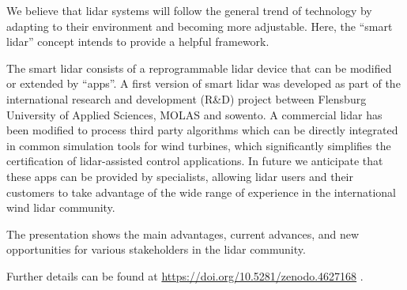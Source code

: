 \begin{altquote}
    We believe that lidar systems will follow the general trend of technology by adapting to their environment and becoming more adjustable. Here, the “smart lidar” concept intends to provide a helpful framework. 

    The smart lidar consists of a reprogrammable lidar device that can be modified or extended by “apps”. A first version of smart lidar was developed as part of the international research and development (R\&D) project between Flensburg University of Applied Sciences, MOLAS and sowento. A commercial lidar has been modified to process third party algorithms which can be directly integrated in common simulation tools for wind turbines, which significantly simplifies the certification of lidar-assisted control applications. In future we anticipate that these apps can be provided by specialists, allowing lidar users and their customers to take advantage of the wide range of experience in the international wind lidar community. 

The presentation shows the main advantages, current advances, and new opportunities for various stakeholders in the lidar community.
\end{altquote}

Further details can be found at \href{https://doi.org/10.5281/zenodo.4627168}{https://doi.org/10.5281/zenodo.4627168} \cite{david_schlipf_2021_4627168}. 

